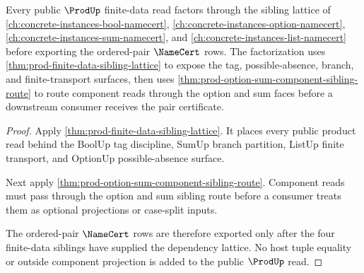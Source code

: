 \begin{proposition}
\label{prop:prod-finite-data-dependency-lattice-read}
Every public $\ProdUp$ finite-data read factors through the sibling lattice of \autoref{ch:concrete-instances-bool-namecert}, \autoref{ch:concrete-instances-option-namecert}, \autoref{ch:concrete-instances-sum-namecert}, and \autoref{ch:concrete-instances-list-namecert} before exporting the ordered-pair $\NameCert$ rows. The factorization uses \autoref{thm:prod-finite-data-sibling-lattice} to expose the tag, possible-absence, branch, and finite-transport surfaces, then uses \autoref{thm:prod-option-sum-component-sibling-route} to route component reads through the option and sum faces before a downstream consumer receives the pair certificate.
\end{proposition}
\begin{proof}
Apply \autoref{thm:prod-finite-data-sibling-lattice}. It places every public product read behind the BoolUp tag discipline, SumUp branch partition, ListUp finite transport, and OptionUp possible-absence surface.

Next apply \autoref{thm:prod-option-sum-component-sibling-route}. Component reads must pass through the option and sum sibling route before a consumer treats them as optional projections or case-split inputs.

The ordered-pair $\NameCert$ rows are therefore exported only after the four finite-data siblings have supplied the dependency lattice. No host tuple equality or outside component projection is added to the public $\ProdUp$ read.
\end{proof}
